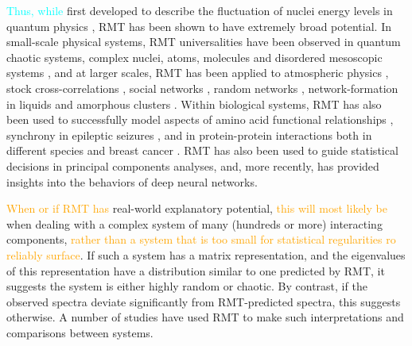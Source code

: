 \documentclass[12pt]{spieman}  %
\begin{document}
\begin{spacing}{2}
\color{black}


\textcolor{cyan}{Thus, while} first developed to describe the fluctuation of nuclei
energy levels in quantum physics \cite{mehtaRandomMatrices2004,
guhrRandommatrixTheoriesQuantum1998a}, RMT has been shown to have extremely
broad potential. In small-scale physical systems, RMT universalities have been
observed in quantum chaotic systems, complex nuclei, atoms, molecules and
disordered mesoscopic systems \cite{guhrRandommatrixTheoriesQuantum1998a,
mehtaRandomMatrices2004, brodyRandommatrixPhysicsSpectrum1981,
beenakkerRandommatrixTheoryQuantum1997,
bohigasHigherOrderCorrelationsSpectra1985, wintgenLevelStatisticsQuantized1988,
pandeySkewOrthogonalPolynomialsUniversality2001}, and at larger scales, RMT has
been applied to atmospheric physics
\cite{santhanamStatisticsAtmosphericCorrelations2001}, stock cross-correlations
\cite{plerouRandomMatrixApproach2002}, social networks
\cite{jalanUncoveringRandomnessSuccess2014}, random networks
\cite{bandyopadhyayUniversalityComplexNetworks2007}, network-formation in
liquids\cite{sastrySpectralStatisticsInstantaneous2001,
matharooSpectralStatisticsQuenched2009} and amorphous clusters
\cite{sarkarUniversalityVibrationalSpectra2004,
matharooVibrationalSpectraAmorphous2005,
matharooUniversalityVibrationalSpectra2008}. Within biological systems, RMT has
also been used to successfully model aspects of  amino acid functional
relationships \cite{bhadolaTargetingFunctionalMotifs2016}, synchrony in
epileptic seizures \cite{osorioPhasesynchronizationRandommatrixBased2011}, and
in protein-protein interactions both in different species
\cite{agrawalQuantifyingRandomnessProtein2014} and breast cancer
\cite{raiRandomnessPreservedPatterns2015}. RMT has also been used to guide
statistical decisions in principal components
analyses\cite{franklinParallelAnalysisMethod1995,
veraartDenoisingDiffusionMRI2016, ulfarssonDimensionEstimationNoisy2008}, and,
more recently, has provided insights into the behaviors of deep neural
networks\cite{martinImplicitSelfRegularizationDeep2021,
martinPredictingTrendsQuality2021}.

\textcolor{orange}{When or if RMT has} real-world explanatory potential,
\textcolor{orange}{this will most likely be} when dealing with a complex system
of many (hundreds or more\cite{mehtaRandomMatrices2004}) interacting
components, \textcolor{orange}{rather than a system that is too small for
statistical regularities ro reliably surface}. If such a system has a matrix
representation, and the eigenvalues of this representation have a distribution
similar to one predicted by RMT, it suggests the system is either highly random
or chaotic. By contrast, if the observed spectra deviate significantly from
RMT-predicted spectra, this
suggests otherwise. A number of studies have used RMT to make such
interpretations and comparisons between
systems\cite{santhanamStatisticsAtmosphericCorrelations2001,
jalanUncoveringRandomnessSuccess2014,
bandyopadhyayUniversalityComplexNetworks2007,
agrawalQuantifyingRandomnessProtein2014, raiRandomnessPreservedPatterns2015,
sebaRandomMatrixAnalysis2003, wangSpectralPropertiesTemporal2015,
wangRandomMatrixTheory2016, matharooSpontaneousBackpainAlters2020}.


\end{spacing}
\end{document}
